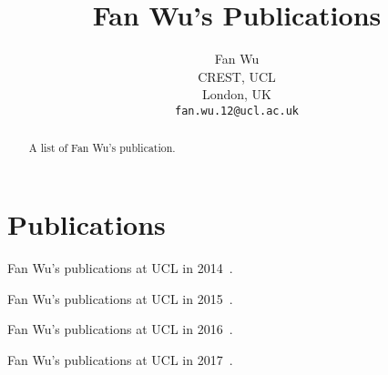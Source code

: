 \documentclass{article}
\begin{document}
\title{Fan Wu's Publications}

\author{
	Fan Wu \\
	CREST, UCL \\
	London, UK \\
	\texttt{fan.wu.12@ucl.ac.uk}
}

\maketitle
\begin{abstract}

A list of Fan Wu's publication.

\end{abstract}

\section{Publications}
Fan Wu's publications at UCL in 2014~\cite{pidgincrasher, harman2014genetic}.

Fan Wu's publications at UCL in 2015~\cite{7107449, Wu:2015:DPO:2739480.2754648, Jia:2015:GIU:2739482.2768417, sbselector}.

Fan Wu's publications at UCL in 2016~\cite{Wu2016, Bowes:2016:MFP:2931037.2931039}.

Fan Wu's publications at UCL in 2017~\cite{Wu201797, 7582553, basios2017darwinian}.



\end{document}
